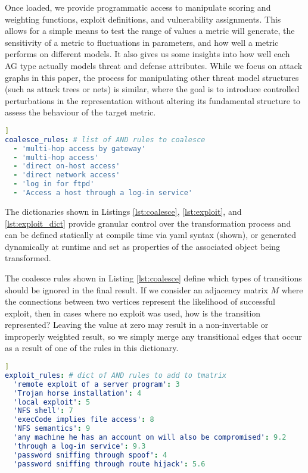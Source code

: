 Once loaded, we provide programmatic access to manipulate scoring and weighting functions, exploit definitions, and vulnerability assignments. This allows for a simple means to test the range of values a metric will generate, the sensitivity of a metric to fluctuations in parameters, and how well a metric performs on different models. It also gives us some insights into how well each AG type actually models threat and defense attributes. While we focus on attack graphs in this paper, the process for manipulating other threat model structures (such as attack trees or nets) is similar, where the goal is to introduce controlled perturbations in the representation without altering its fundamental structure to assess the behaviour of the target metric.

\begin{lstlisting}[language=yaml, label={lst:coalesce}, caption={Node Labels to Coalesce},captionpos=b, ]]
coalesce_rules: # list of AND rules to coalesce
  - 'multi-hop access by gateway'
  - 'multi-hop access'
  - 'direct on-host access'
  - 'direct network access'
  - 'log in for ftpd'
  - 'Access a host through a log-in service'
  \end{lstlisting}

The dictionaries shown in Listings \ref{lst:coalesce}, \ref{lst:exploit}, and \ref{lst:exploit_dict} provide granular control over the transformation process and can be defined statically at compile time via yaml syntax (shown), or generated dynamically at runtime and set as properties of the associated object being transformed. 

The coalesce rules shown in Listing \ref{lst:coalesce} define which types of transitions should be ignored in the final result. If we consider an adjacency matrix $M$ where the connections between two vertices represent the likelihood of successful exploit, then in cases where no exploit was used, how is the transition represented? Leaving the value at zero may result in a non-invertable or improperly weighted result, so we simply merge any transitional edges that occur as a result of one of the rules in this dictionary.

\begin{lstlisting}[language=yaml, label={lst:exploit}, caption={Fixed Scores for Exploit Classes},captionpos=b, ]]
exploit_rules: # dict of AND rules to add to tmatrix
  'remote exploit of a server program': 3
  'Trojan horse installation': 4
  'local exploit': 5
  'NFS shell': 7
  'execCode implies file access': 8
  'NFS semantics': 9
  'any machine he has an account on will also be compromised': 9.2
  'through a log-in service': 9.3
  'password sniffing through spoof': 4
  'password sniffing through route hijack': 5.6
\end{lstlisting}

